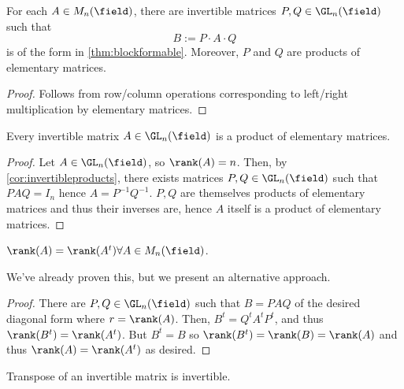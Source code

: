 \begin{corollary}\label{cor:invertibleproducts}
    For each $A \in M_n(\field)$, there are invertible matrices $P, Q \in \GL_n(\field)$ such that \[
    B := P \cdot A \cdot Q    
    \]
    is of the form in \cref{thm:blockformable}. Moreover, $P$ and $Q$ are products of elementary matrices.
\end{corollary}

\begin{proof}
    Follows from row/column operations corresponding to left/right multiplication by elementary matrices.
\end{proof}

\begin{corollary}
    Every invertible matrix $A \in \GL_n(\field)$ is a product of elementary matrices.
\end{corollary}
\begin{proof}
    Let $A \in \GL_n(\field)$, so $\rank(A) = n$. Then, by \cref{cor:invertibleproducts}, there exists matrices $P, Q \in \GL_n(\field)$ such that $P A Q = I_n$ hence $A = P^{-1}Q^{-1}$. $P,Q$ are themselves products of elementary matrices and thus their inverses are, hence $A$ itself is a product of elementary matrices.
\end{proof}

\begin{corollary}
    $\rank(A) = \rank(A^t) \forall A \in M_n(\field)$.
\end{corollary}

\begin{remark}
    We've already proven this, but we present an alternative approach.
\end{remark}

\begin{proof}
    There are $P, Q \in \GL_n(\field)$ such that $B = PAQ$ of the desired diagonal form where $r = \rank(A)$. Then, $B^t = Q^t A^t P^t$, and thus $\rank(B^t) = \rank(A^t)$. But $B^t = B$ so $\rank(B^t) = \rank(B) = \rank(A)$ and thus $\rank(A) = \rank(A^t)$ as desired.
\end{proof}

\begin{corollary}
    Transpose of an invertible matrix is invertible.
\end{corollary}
